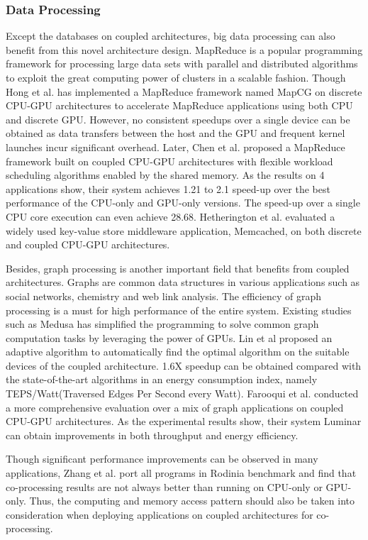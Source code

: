 \subsubsection{Data Processing}
Except the databases on coupled architectures, big data processing can also benefit from this novel architecture design. MapReduce \cite{Dean2004} is a popular programming framework for processing large data sets with parallel and distributed algorithms to exploit the great computing power of clusters in a scalable fashion. Though Hong et al. \cite{Hong2010} has implemented a MapReduce framework named MapCG on discrete CPU-GPU architectures to accelerate MapReduce applications using both CPU and discrete GPU. However, no consistent speedups over a single device can be obtained as data transfers between the host and the GPU and frequent kernel launches incur significant overhead. Later, Chen et al. \cite{Chen2012} proposed a MapReduce framework built on coupled CPU-GPU architectures with flexible workload scheduling algorithms enabled by the shared memory. As the results on 4 applications show, their system achieves 1.21 to 2.1 speed-up over the best performance of the CPU-only and GPU-only versions. The speed-up over a single CPU core execution can even achieve 28.68. Hetherington et al. \cite{Hetherington2012} evaluated a widely used key-value store middleware application, Memcached, on both discrete and coupled CPU-GPU architectures.

Besides, graph processing is another important field that benefits from coupled architectures. Graphs are common data structures in various applications such as social networks, chemistry and web link analysis. The efficiency of graph processing is a must for high performance of the entire system. Existing studies such as Medusa \cite{Zhong2014} has simplified the programming to solve common graph computation tasks by leveraging the power of GPUs. Lin et al \cite{Linheng2015} proposed an adaptive algorithm to automatically find the optimal algorithm on the suitable devices of the coupled architecture. 1.6X speedup can be obtained compared with the state-of-the-art algorithms in an energy consumption index, namely TEPS/Watt(Traversed Edges Per Second every Watt). Farooqui et al. \cite{Farooqui2016} conducted a more comprehensive evaluation over a mix of graph applications on coupled CPU-GPU architectures. As the experimental results show, their system Luminar can obtain improvements in both throughput and energy efficiency.

Though significant performance improvements can be observed in many applications, Zhang et al. \cite{Zhangfeng2015} port all programs in Rodinia benchmark and find that co-processing results are not always better than running on CPU-only or GPU-only. Thus, the computing and memory access pattern should also be taken into consideration when deploying applications on coupled architectures for co-processing.

